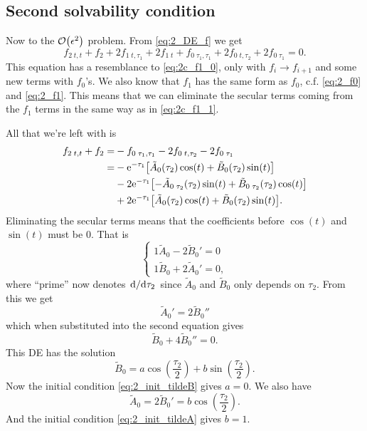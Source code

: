 \documentclass[11pt,letter, swedish, english
]{article}
\begin{document}
\subsection{Second solvability condition}
Now to the $\order{\epsilon^2}$ problem. From \eqref{eq:2_DE_f} we get
\begin{equation}
f_{2\;t,t}+f_2 + 2f_{1\;t,\tau_1} +2f_{1\;t}
+f_{0\;\tau_1,\tau_1}+2f_{0\;t,\tau_2}+2f_{0\;\tau_1}
=0.
\end{equation}
This equation has a resemblance to \eqref{eq:2c_f1_0}, only with
$f_i\to f_{i+1}$ and some new terms with $f_0$'s. We also know that
$f_1$ has the same form as $f_0$, c.f. \eqref{eq:2_f0} and
\eqref{eq:2_f1}. This means that we can eliminate the secular terms
coming from the $f_1$ terms in the same way as in
\eqref{eq:2c_f1_1}. 

All that we're left with is
\begin{equation}
\begin{aligned}
f_{2\;t,t}+f_2 =& %
-f_{0\;\tau_1,\tau_1}-2f_{0\;t,\tau_2}-2f_{0\;\tau_1}\\
=& -\ee^{-\tau_1}
\qty[\tilde{A}_0(\tau_2)\cos(t)+\tilde{B}_0(\tau_2)\sin(t)]\\
&-2\ee^{-\tau_1}
\qty[-\tilde{A}_{0\;\tau_2}(\tau_2)\sin(t)+\tilde{B}_{0\;\tau_2}(\tau_2)\cos(t)]\\
&+2\ee^{-\tau_1}
\qty[\tilde{A}_{0}(\tau_2)\cos(t)+\tilde{B}_0(\tau_2)\sin(t)].
\end{aligned}
\end{equation}
Eliminating the secular terms means that the coefficients before
$\cos(t)$ and $\sin(t)$ must be 0. That is
\begin{equation}
\begin{cases}
1\tilde{A}_{0}-2\tilde{B}_{0}'=0\\
1\tilde{B}_{0}+2\tilde{A}_{0}'=0,
\end{cases}
\end{equation}
where ``prime'' now denotes $\dv*{\tau_2}$ since $\tilde{A}_0$ and
$\tilde{B}_0$ only depends on $\tau_2$.
From this we get
\begin{equation}
\tilde{A}_{0}'=2\tilde{B}_{0}''
\end{equation}
which when substituted into the second equation gives
\begin{equation}
\tilde{B}_0+4\tilde{B}_0''=0.
\end{equation}
This DE has the solution
\begin{equation}
\tilde{B}_0=a\cos(\frac{\tau_2}{2})+b\sin(\frac{\tau_2}{2}).
\end{equation}
Now the initial condition \eqref{eq:2_init_tildeB} gives $a=0$. We
also have
\begin{equation}
\tilde{A}_{0}=2\tilde{B}_{0}'=b\cos(\frac{\tau_2}{2}).
\end{equation}
And the initial condition \eqref{eq:2_init_tildeA} gives $b=1$.
\end{document}
